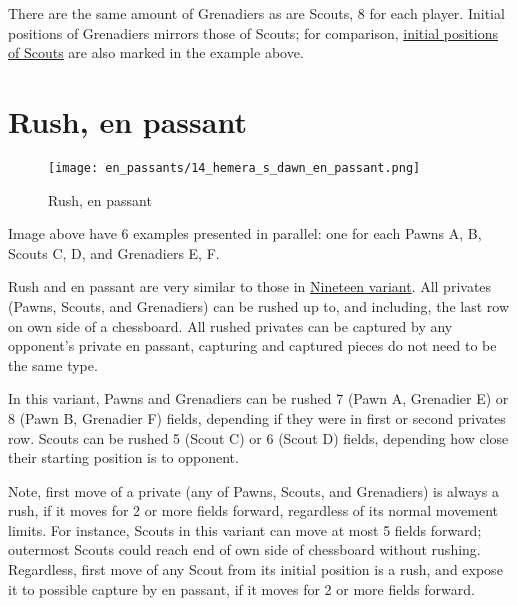 There are the same amount of Grenadiers as are Scouts, 8 for each player.
Initial positions of Grenadiers mirrors those of Scouts; for comparison,
\hyperref[fig:scn_hd_39_scout_initial_positions]{initial positions of Scouts}
are also marked in the example above.

\clearpage %

\section*{Rush, en passant}
\label{sec:Hemera's Dawn/Rush, en passant}

\vspace*{-2.3\baselineskip}
\noindent
\begin{figure}[!h]
\texttt{[image: en\_passants/14\_hemera\_s\_dawn\_en\_passant.png]}
\vspace*{-1.3\baselineskip}
\caption{Rush, en passant}
\label{fig:14_hemera_s_dawn_en_passant}
\end{figure}

\vspace*{-0.5\baselineskip}
Image above have 6 examples presented in parallel: one for each Pawns A, B,
Scouts C, D, and Grenadiers E, F.

Rush and en passant are very similar to those in
\hyperref[fig:12_nineteen_en_passant]{Nineteen variant}.
All privates (Pawns, Scouts, and Grenadiers) can be rushed up to, and including,
the last row on own side of a chessboard. All rushed privates can be captured by
any opponent's private en passant, capturing and captured pieces do not need to
be the same type.

In this variant, Pawns and Grenadiers can be rushed 7 (Pawn A, Grenadier E) or 8
(Pawn B, Grenadier F) fields, depending if they were in first or second privates
row. Scouts can be rushed 5 (Scout C) or 6 (Scout D) fields, depending how close
their starting position is to opponent.

Note, first move of a private (any of Pawns, Scouts, and Grenadiers) is always a
rush, if it moves for 2 or more fields forward, regardless of its normal movement
limits.\newline
\indent
For instance, Scouts in this variant can move at most 5 fields forward; outermost
Scouts could reach end of own side of chessboard without rushing. Regardless, first
move of any Scout from its initial position is a rush, and expose it to possible
capture by en passant, if it moves for 2 or more fields forward.

